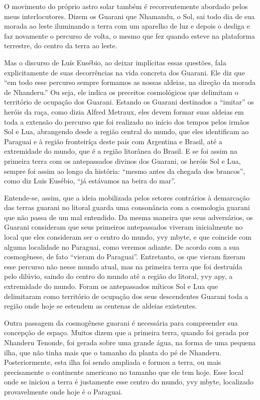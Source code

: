 O movimento do próprio astro solar também é recorrentemente abordado
pelos meus interlocutores. Dizem os Guarani que Nhamandu, o Sol, sai
todo dia de sua morada ao leste iluminando a terra com um aparelho de
luz e depois o desliga e faz novamente o percurso de volta, o mesmo que
fez quando esteve na plataforma terrestre, do centro da terra ao leste.

Mas o discurso de Luís Eusébio, ao deixar implícitas essas questões,
fala explicitamente de suas decorrências na vida concreta dos Guarani.
Ele diz que ``em todo esse percurso sempre formamos as nossas aldeias,
na direção da morada de Nhanderu.'' Ou seja, ele indica os preceitos
cosmológicos que delimitam o território de ocupação dos Guarani.
Estando os Guarani destinados a ``imitar'' os heróis da raça, como dizia
Alfred Metraux, eles devem formar suas aldeias em toda a extensão do
percurso que foi realizado no início dos tempos pelos irmãos Sol e Lua,
abrangendo desde a região central do mundo, que eles identificam ao
Paraguai e à região fronteiríça deste país com Argentina e Brasil, até
a extremidade do mundo, que é a região litorânea do Brasil. E se foi
assim na primeira terra com os antepassados divinos dos Guarani, os
heróis Sol e Lua, sempre foi assim ao longo da história: ``mesmo antes
da chegada dos brancos'', como diz Luis Eusébio, ``já estávamos na beira
do mar''.

Entende-se, assim, que a ideia mobilizada pelos setores contrários à
demarcação das terras guarani no litoral guarda uma consonância com a
cosmologia guarani que não passa de um mal entendido. Da mesma maneira
que seus adversários, os Guarani consideram que seus primeiros
antepassados viveram inicialmente no local que eles consideram ser o
centro do mundo, yvy mbyte, e que coincide com alguma localidade no
Paraguai, como veremos adiante. De acordo com a sua cosmogênese, de
fato ``vieram do Paraguai''. Entretanto, os que vieram fizeram esse
percurso não nesse mundo atual, mas na primeira terra que foi destruída
pelo dilúvio, saindo do centro do mundo até a região do litoral, yvy
apy, a extremidade do mundo. Foram os antepassados míticos Sol e Lua
que delimitaram como território de ocupação dos seus descendentes
Guarani toda a região onde hoje se estendem as centenas de aldeias
existentes.

Outra passagem da cosmogênese guarani é necessária para compreender sua
concepção de espaço. Muitos dizem que a primeira terra, quando foi
gerada por Nhanderu Tenonde, foi gerada sobre uma grande água, na forma
de uma pequena ilha, que não tinha mais que o tamanho da planta do pé
de Nhanderu. Posteriormente, esta ilha foi sendo ampliada e formou a
terra, ou mais precisamente o continente americano no tamanho que ele
tem hoje. Esse local onde se iniciou a terra é justamente esse centro
do mundo, yvy mbyte, localizado provavelmente onde hoje é o Paraguai.

